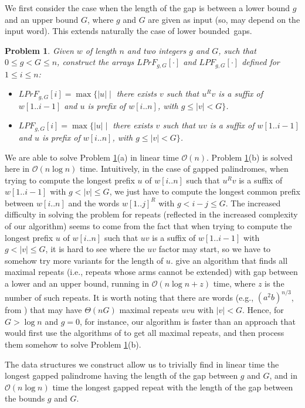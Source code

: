 \documentclass[final]{dmtcs-episciences}
\newcommand{\bigo}{{\mathcal O}}
\newcommand{\LPF}{{\mathit{LPrF}}}
\newcommand{\LPdF}{{\mathit{LPF}}}
\newtheorem{problem}{Problem}
\begin{document}
We first consider the case when the length of the gap is between a lower bound $g$ and an upper bound $G$, where $g$ and $G$ are given as input (so, may depend on the input word). This extends naturally the case of lower bounded~gaps. 
\begin{problem}\label{LPFgG}
Given $w$ of length $n$ and two integers $g$ and $G$, such that $0\leq g< G\leq n$, construct the arrays $\LPF_{g,G}[\cdot]$ and $\LPdF_{g,G}[\cdot]$ defined for $1\leq i\leq n$:
\begin{itemize} 
\item[a.] $\LPF_{g,G}[i]=\max\{|u|\mid$ there exists $v$ such that $u^Rv$ is a suffix of $w[1..i-1]$ and $u$ is prefix of $w[i..n]$, with $ g\leq  |v|< G\}$.
\item[b.]$\LPdF_{g,G}[i]=\max\{|u|\mid$ there exists $v$ such that $uv$ is a suffix of $w[1..i-1]$ and $u$ is prefix of $w[i..n]$, with $ g\leq |v|< G\}$.
\end{itemize}
\end{problem}
We are able to solve Problem \ref{LPFgG}(a) in linear time $\bigo(n)$. Problem \ref{LPFgG}(b)  is solved here in $\bigo(n\log n)$ time. Intuitively, in the case of gapped palindromes, when trying to compute the longest prefix $u$ of $w[i..n]$ such that $u^Rv$ is a suffix of $w[1..i-1]$ with $g<|v|\leq G$, we just have to compute the longest common prefix between $w[i..n]$ and the words $w[1..j]^R$ with $g<i-j\leq G$. The increased difficulty in solving the problem for repeats (reflected in the increased complexity of our algorithm) seems to come from the fact that when trying to compute the longest prefix $u$ of $w[i..n]$ such that $uv$ is a suffix of $w[1..i-1]$ with $g<|v|\leq G$, it is hard to see where the $uv$ factor may start, so we have to somehow try more variants for the length of $u$. \cite{Brodal} give an algorithm that finds all maximal repeats (i.e., repeats whose arms cannot be extended) with gap between a lower and an upper bound, running in $\bigo(n\log n+z)$ time, where $z$ is the number of such repeats. It is worth noting that there are words (e.g., $(a^2b)^{n/3}$, from \cite{Brodal}) that may have $\Theta(n G)$ maximal repeats $uvu$ with $|v|<G$. Hence, for $G>\log n$ and $g=0$, for instance, our algorithm is faster than an approach that would first use the algorithms of \cite{Brodal} to get all maximal repeats, and then process them somehow to solve Problem \ref{LPFgG}(b). 

The data structures we construct allow us to trivially find in linear time the longest gapped palindrome having the length of the gap between $g$ and $G$, and in $\bigo(n \log n)$ time the longest gapped repeat with the length of the gap between the bounds $g$ and $G$.  
\end{document}
